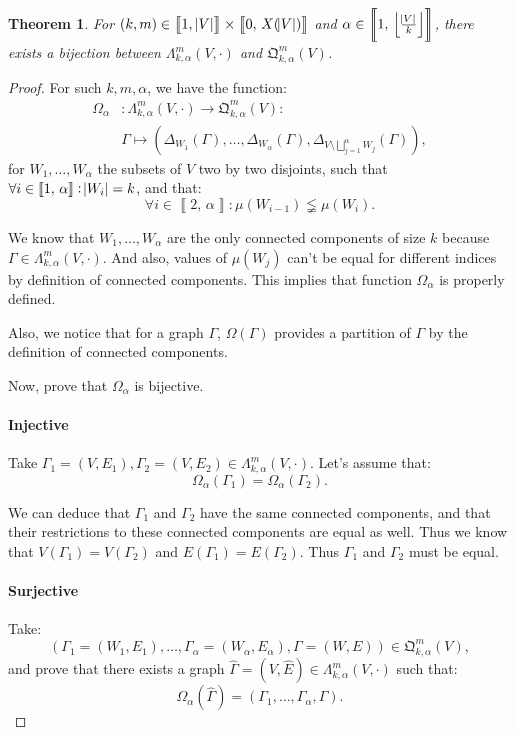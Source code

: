 \documentclass{article}
\newtheorem{theorem}[lemma]{Theorem}
\theoremstyle{definition}
\theoremstyle{remark}
\newcommand{\intint}[2]{\left\llbracket#1, \, #2\right\rrbracket}
\newcommand{\floor}[1]{\left\lfloor#1\right\rfloor}
\begin{document}
			\begin{theorem} For $(k, m) \in \intint 1{\abs V} \times \intint 0{X(\abs V)}$ and $\alpha \in \intint 1{\floor {\frac {\abs V}k}}$,  there exists a
			bijection between $\Lambda_{k,\alpha}^m(V, \cdot)$ and $\mathfrak Q_{k,\alpha}^m(V)$.
			\end{theorem}

			\begin{proof} For such $k, m, \alpha$, we have the function:
			\begin{align*}
				\Omega_\alpha &: \Lambda_{k,\alpha}^m(V, \cdot) \to \mathfrak Q_{k,\alpha}^m(V) : \\
				&\Gamma \mapsto \left(\Delta_{W_1}(\Gamma), \ldots, \Delta_{W_\alpha}(\Gamma), \Delta_{V \setminus \bigsqcup_{j=1}^\alpha W_j}(\Gamma)\right),
			\end{align*}
			for $W_1, \ldots, W_\alpha$ the subsets of $V$ two by two disjoints, such that $\forall i \in \intint 1\alpha : \abs {W_i}=k$, and that:
			\[\forall i \in \intint 2\alpha : \mu(W_{i-1}) \lneqq \mu(W_i).\]

			We know that $W_1, \ldots, W_\alpha$ are the only connected components of size $k$ because $\Gamma \in \Lambda_{k,\alpha}^m(V, \cdot)$. And also,
			values of $\mu(W_j)$ can't be equal for different indices by definition of connected components. This implies that function $\Omega_\alpha$ is properly
			defined.

			Also, we notice that for a graph $\Gamma$, $\Omega(\Gamma)$ provides a partition of $\Gamma$ by the definition of connected components.

			Now, prove that $\Omega_\alpha$ is bijective.

			\paragraph{Injective} Take $\Gamma_1 = (V, E_1), \Gamma_2 = (V, E_2) \in \Lambda_{k,\alpha}^m(V, \cdot)$. Let's assume that:
			\[\Omega_\alpha(\Gamma_1) = \Omega_\alpha(\Gamma_2).\]

			We can deduce that $\Gamma_1$ and $\Gamma_2$ have the same connected components, and that their restrictions to these connected components are equal as well.
			Thus we know that $V(\Gamma_1) = V(\Gamma_2)$ and $E(\Gamma_1) = E(\Gamma_2)$. Thus $\Gamma_1$ and $\Gamma_2$ must be equal.

			\paragraph{Surjective} Take:
			\[\left(\Gamma_1 = (W_1, E_1), \ldots, \Gamma_\alpha = (W_\alpha, E_\alpha), \Gamma = (W, E)\right) \in \mathfrak Q_{k,\alpha}^m(V),\]
			and prove that there exists a graph $\hat \Gamma = (V, \hat E) \in \Lambda_{k,\alpha}^m(V, \cdot)$ such that:
			\[\Omega_\alpha(\hat \Gamma) = \left(\Gamma_1, \ldots, \Gamma_\alpha, \Gamma\right).\]


\end{proof}
\end{document}
